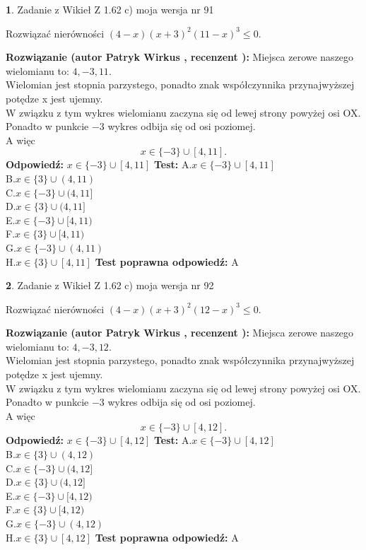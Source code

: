 \documentclass[12pt, a4paper]{article}
\theoremstyle{definition} %
\newtheorem{zad}{}
\newcommand{\zadStart}[1]{\begin{zad}#1\newline}
\newcommand{\zadStop}{\end{zad}}
\newcommand{\rozwStart}[2]{\noindent \textbf{Rozwiązanie (autor #1 , recenzent #2): }\newline}
\newcommand{\rozwStop}{\newline}
\newcommand{\odpStart}{\noindent \textbf{Odpowiedź:}\newline}
\newcommand{\odpStop}{\newline}
\newcommand{\testStart}{\noindent \textbf{Test:}\newline}
\newcommand{\testStop}{\newline}
\newcommand{\kluczStart}{\noindent \textbf{Test poprawna odpowiedź:}\newline}
\newcommand{\kluczStop}{\newline}
\begin{document}
\zadStart{Zadanie z Wikieł Z 1.62 c) moja wersja nr 91}

Rozwiązać nierówności $(4-x)(x+3)^{2}(11-x)^{3}\le0$.
\zadStop
\rozwStart{Patryk Wirkus}{}
Miejsca zerowe naszego wielomianu to: $4, -3, 11$.\\
Wielomian jest stopnia parzystego, ponadto znak współczynnika przy\linebreak najwyższej potędze x jest ujemny.\\ W związku z tym wykres wielomianu zaczyna się od lewej strony powyżej osi OX.\\
Ponadto w punkcie $-3$ wykres odbija się od osi poziomej.\\
A więc $$x \in \{-3\} \cup [4,11].$$
\rozwStop
\odpStart
$x \in \{-3\} \cup [4,11]$
\odpStop
\testStart
A.$x \in \{-3\} \cup [4,11]$\\
B.$x \in \{3\} \cup (4,11)$\\
C.$x \in \{-3\} \cup (4,11]$\\
D.$x \in \{3\} \cup (4,11]$\\
E.$x \in \{-3\} \cup [4,11)$\\
F.$x \in \{3\} \cup [4,11)$\\
G.$x \in \{-3\} \cup (4,11)$\\
H.$x \in \{3\} \cup [4,11]$
\testStop
\kluczStart
A
\kluczStop



\zadStart{Zadanie z Wikieł Z 1.62 c) moja wersja nr 92}

Rozwiązać nierówności $(4-x)(x+3)^{2}(12-x)^{3}\le0$.
\zadStop
\rozwStart{Patryk Wirkus}{}
Miejsca zerowe naszego wielomianu to: $4, -3, 12$.\\
Wielomian jest stopnia parzystego, ponadto znak współczynnika przy\linebreak najwyższej potędze x jest ujemny.\\ W związku z tym wykres wielomianu zaczyna się od lewej strony powyżej osi OX.\\
Ponadto w punkcie $-3$ wykres odbija się od osi poziomej.\\
A więc $$x \in \{-3\} \cup [4,12].$$
\rozwStop
\odpStart
$x \in \{-3\} \cup [4,12]$
\odpStop
\testStart
A.$x \in \{-3\} \cup [4,12]$\\
B.$x \in \{3\} \cup (4,12)$\\
C.$x \in \{-3\} \cup (4,12]$\\
D.$x \in \{3\} \cup (4,12]$\\
E.$x \in \{-3\} \cup [4,12)$\\
F.$x \in \{3\} \cup [4,12)$\\
G.$x \in \{-3\} \cup (4,12)$\\
H.$x \in \{3\} \cup [4,12]$
\testStop
\kluczStart
A
\kluczStop
\end{document}
